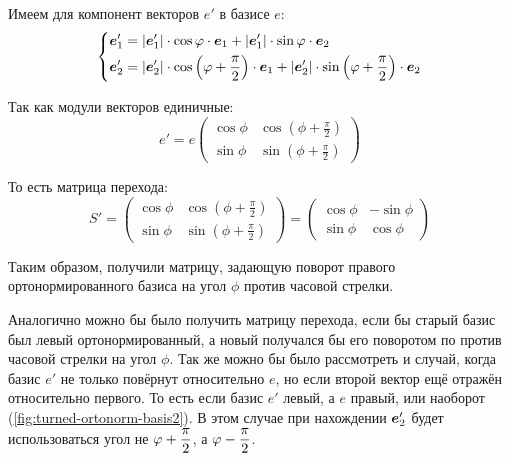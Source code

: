 \documentclass[a4paper,12pt]{article}
\begin{document}
  Имеем для компонент векторов $e'$ в базисе $e$:
  \[
    \left\{
      \begin{aligned}
        &\boldsymbol e_1' = |\boldsymbol e_1'| \cdot \cos\varphi \cdot \boldsymbol e_1 + |\boldsymbol e_1'| \cdot \sin\varphi \cdot \boldsymbol e_2\\
        &\boldsymbol e_2' = |\boldsymbol e_2'| \cdot \cos{\left(\varphi+ \frac{\pi}{2}\right)} \cdot \boldsymbol e_1 + |\boldsymbol e_2'| \cdot \sin{\left(\varphi+ \frac{\pi}{2}\right)} \cdot \boldsymbol e_2
      \end{aligned}
    \right.
  \]
  
  Так как модули векторов единичные:
  \[
    e' = e \begin{pmatrix}
      \cos\phi & \cos{\left(\phi + \frac{\pi}{2}\right)}\\
      \sin\phi & \sin{\left(\phi + \frac{\pi}{2}\right)}
    \end{pmatrix}
  \]
  
  То есть матрица перехода:
  \[
    S' = \begin{pmatrix}
      \cos\phi & \cos{\left(\phi + \frac{\pi}{2}\right)}\\
      \sin\phi & \sin{\left(\phi + \frac{\pi}{2}\right)}
    \end{pmatrix}
    = \begin{pmatrix}
      \cos\phi & -\sin\phi\\
      \sin\phi & \cos\phi
    \end{pmatrix}
  \]
  
  Таким образом, получили матрицу, задающую поворот правого ортонормированного базиса на угол $\phi$ против часовой стрелки.
  
  Аналогично можно бы было получить матрицу перехода, если бы старый базис был левый ортонормированный, а новый получался бы его поворотом по против часовой стрелки на угол $\phi$.
  Так же можно бы было рассмотреть и случай, когда базис $e'$ не только повёрнут относительно $e$, но если второй вектор ещё отражён относительно первого.
  То есть если базис $e'$ левый, а $e$ правый, или наоборот (\ref{fig:turned-ortonorm-basis2}).
  В этом случае при нахождении $\boldsymbol e_2'$ будет использоваться угол не $\phi \hm+ \dfrac{\pi}{2}$, а $\phi \hm- \dfrac{\pi}{2}$.
  
\end{document}
